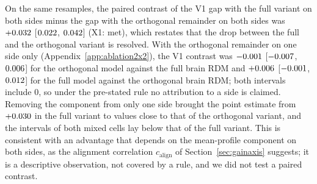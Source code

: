 On the same resamples, the paired contrast of the V1 gap with the full variant on both
sides minus the gap with the orthogonal remainder on both sides was $+0.032$ [$0.022$, $0.042$] (X1: met), which restates
that the drop between the full and the orthogonal variant is resolved. With the orthogonal
remainder on one side only (Appendix~\ref{app:ablation2x2}), the V1 contrast was
$-0.001$ [$-0.007$, $0.006$] for the orthogonal model
against the full brain RDM and $+0.006$ [$-0.001$,
$0.012$] for the full model against the orthogonal brain RDM; both intervals
include 0, so under the pre-stated rule no attribution to a side is claimed. Removing the component from only one side brought the point estimate from $+0.030$ in the full variant to values close to that of the orthogonal variant, and the intervals of both mixed cells lay below that of the full variant. This is consistent with an advantage that depends on the mean-profile component on both sides, as the alignment correlation $c_{\mathrm{align}}$ of Section~\ref{sec:gainaxis} suggests; it is a descriptive observation, not covered by a rule, and we did not test a paired contrast.
